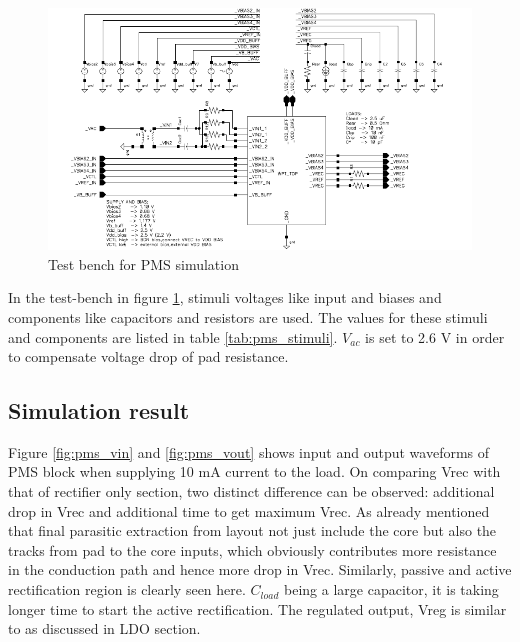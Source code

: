 \documentclass[12pt,a4paper,UKenglish]{report}
\begin{document}
\begin{figure} [H]
  \centering
  \includegraphics[width=1.05\textwidth]{img/pms_top_testbench.pdf} 
 \caption{Test bench for PMS simulation } 
\label{fig:wpt_top_testbench} 
\end{figure}

In the test-bench in figure \ref{fig:wpt_top_testbench}, stimuli voltages like input and biases and components like capacitors and resistors are used. 
The values for these stimuli and components are listed in table \ref{tab:pms_stimuli}. $V_{ac} $ is set to 2.6 V in
order to compensate voltage drop of pad resistance.  \\ 


\subsection{Simulation result} %

Figure \ref{fig:pms_vin} and \ref{fig:pms_vout} shows input and output waveforms of PMS block when supplying 10 mA current to the load. On comparing Vrec with 
that of rectifier only section, two distinct difference can be observed: additional drop in Vrec and additional time to 
get maximum Vrec. As already mentioned that final parasitic extraction from layout not just include the core but also 
the tracks from pad to the core inputs, which obviously contributes more resistance in the conduction path and hence 
more drop in Vrec. Similarly, passive and active rectification region is clearly seen here. $C_{load}$ being a large 
capacitor, it is taking longer time to start the active rectification. The regulated output, Vreg is similar to as discussed in LDO section. \\
\end{document}
